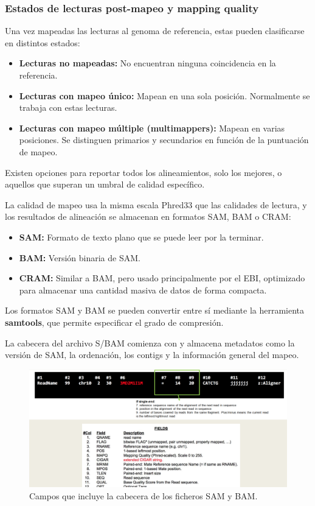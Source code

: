 \subsubsection{Estados de lecturas post-mapeo y mapping quality}
Una vez mapeadas las lecturas al genoma de referencia, estas pueden clasificarse en distintos estados:
\begin{itemize}
\item \textbf{Lecturas no mapeadas:} No encuentran ninguna coincidencia en la referencia.
\item \textbf{Lecturas con mapeo único:} Mapean en una sola posición. Normalmente se trabaja con estas lecturas.
\item \textbf{Lecturas con mapeo múltiple (multimappers):} Mapean en varias posiciones. Se distinguen primarios y secundarios en función de la puntuación de mapeo.
\end{itemize}

Existen opciones para reportar todos los alineamientos, solo los mejores, o aquellos que superan un umbral de calidad específico.

La calidad de mapeo usa la misma escala Phred33 que las calidades de lectura, y los resultados de alineación se almacenan en formatos SAM, BAM o CRAM:
\begin{itemize}
\item \textbf{SAM:} Formato de texto plano que se puede leer por la terminar.
\item \textbf{BAM:} Versión binaria de SAM.
\item \textbf{CRAM:} Similar a BAM, pero usado principalmente por el EBI, optimizado para almacenar una cantidad masiva de datos de forma compacta.
\end{itemize}

Los formatos SAM y BAM se pueden convertir entre sí mediante la herramienta \textbf{samtools}, que permite especificar el grado de compresión.

La cabecera del archivo S/BAM comienza con \@ y almacena metadatos como la versión de SAM, la ordenación, los contigs y la información general del mapeo. 
\begin{figure}
\centering
\includegraphics[width = \textwidth]{figs/sam-header.png}
\caption{Campos que incluye la cabecera de los ficheros SAM y BAM.}
\end{figure}

